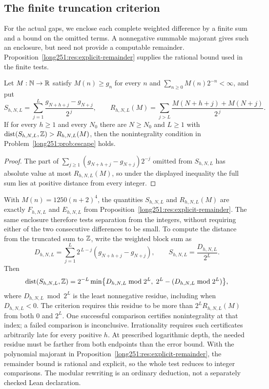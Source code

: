 \documentclass[11pt]{article}
\begin{document}
\subsection{The finite truncation criterion}\label{long251:sec:xr-truncation}

For the actual gaps, we enclose each complete weighted difference by a
finite sum and a bound on the omitted terms.  A nonnegative summable
majorant gives such an enclosure, but need not provide a computable
remainder.  Proposition~\ref{long251:res:explicit-remainder} supplies
the rational bound used in the finite tests.

\begin{samepage}
\begin{proposition}\label{long251:xr:truncation}
Let $M:\mathbb{N}\to\mathbb{R}$ satisfy $M(n)\ge g_n$ for every $n$ and
$\sum_{n\ge0}M(n)2^{-n}<\infty$, and put
\[
 S_{h,N,L}=\sum_{j=1}^{L}\frac{g_{N+h+j}-g_{N+j}}{2^{\,j}},\qquad
 R_{h,N,L}(M)=\sum_{j>L}\frac{M(N+h+j)+M(N+j)}{2^{\,j}} .
\]
If for every $h\ge1$ and every $N_0$ there are $N\ge N_0$ and $L\ge1$ with
$\operatorname{dist}(S_{h,N,L},\mathbb{Z})>R_{h,N,L}(M)$, then the nonintegrality
condition in Problem~\ref{long251:prob:escape} holds.
\end{proposition}
\end{samepage}

\begin{proof}
The part of $\sum_{j\ge1}(g_{N+h+j}-g_{N+j})2^{-j}$ omitted from $S_{h,N,L}$
has absolute value at most $R_{h,N,L}(M)$, so under the displayed inequality
the full sum lies at positive distance from every integer.
\end{proof}

With $M(n)=1250(n+2)^4$, the quantities $S_{h,N,L}$ and
$R_{h,N,L}(M)$ are exactly $F_{h,N,L}$ and $E_{h,N,L}$ from
Proposition~\ref{long251:res:explicit-remainder}.  The same enclosure
therefore tests separation from the integers, without requiring either
of the two consecutive differences to be small.  To compute the distance
from the truncated sum to $\mathbb{Z}$, write the weighted block sum as
\[
 D_{h,N,L}=\sum_{j=1}^{L}2^{\,L-j}(g_{N+h+j}-g_{N+j}),
 \qquad S_{h,N,L}=\frac{D_{h,N,L}}{2^{L}}.
\]
Then
\[
 \operatorname{dist}(S_{h,N,L},\mathbb{Z})
 =2^{-L}\min\bigl\{D_{h,N,L}\bmod2^{L},\;
 2^{L}-(D_{h,N,L}\bmod2^{L})\bigr\},
\]
where $D_{h,N,L}\bmod2^{L}$ is the least nonnegative residue, including when
$D_{h,N,L}<0$.  The criterion requires this residue to be more than
$2^LR_{h,N,L}(M)$ from both $0$ and $2^L$.  One successful comparison certifies nonintegrality at that index;
a failed comparison is inconclusive.  Irrationality requires such
certificates arbitrarily late for every positive $h$.  At prescribed
logarithmic depth, the needed residue must be farther from both endpoints
than the error bound.  With the polynomial majorant in
Proposition~\ref{long251:res:explicit-remainder}, the remainder bound is
rational and explicit, so the whole test reduces to integer comparisons.
The modular rewriting is an ordinary deduction, not a separately checked
Lean declaration.
\end{document}
